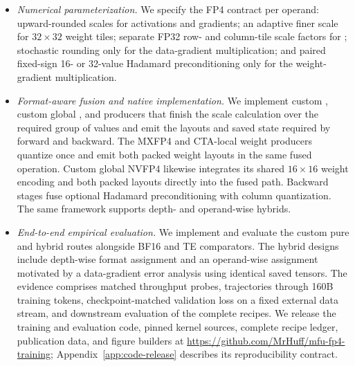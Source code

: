 \begin{itemize}
  \item \emph{Numerical parameterization.} We specify the FP4 contract per
        operand: upward-rounded \mxfp{} scales for activations and gradients;
        an adaptive finer scale for $32\times32$ weight tiles; separate FP32
        row- and column-tile scale factors for \localcta{}; stochastic
        rounding only for the data-gradient multiplication; and paired
        fixed-sign 16- or 32-value Hadamard preconditioning only for the
        weight-gradient multiplication.

  \item \emph{Format-aware fusion and native implementation.} We implement
        custom \mxfp{}, custom global \nvfp{}, and \localcta{} producers that
        finish the scale calculation over the required group of values and emit the layouts and saved
        state required by forward and backward. The MXFP4 and CTA-local weight
        producers quantize once and emit both packed weight layouts in the same
        fused operation. Custom global NVFP4 likewise integrates its shared
        $16\times16$ weight encoding and both packed layouts directly into the
        fused path. Backward stages fuse optional Hadamard preconditioning
        with column quantization. The same framework supports depth- and
        operand-wise hybrids.

  \item \emph{End-to-end empirical evaluation.} We implement and evaluate the
        custom pure and hybrid routes alongside BF16 and TE comparators. The
        hybrid designs include depth-wise format assignment and an operand-wise
        assignment motivated by a data-gradient error analysis using identical
        saved tensors. The evidence
        comprises matched throughput probes, trajectories through 160B
        training tokens, checkpoint-matched validation loss on a fixed
        external data stream, and
        downstream evaluation of the complete recipes. We release the
        training and evaluation code, pinned kernel sources, complete recipe
        ledger, publication data, and figure builders at
        \url{https://github.com/MrHuff/mfu-fp4-training};
        Appendix~\ref{app:code-release} describes its reproducibility contract.
\end{itemize}
